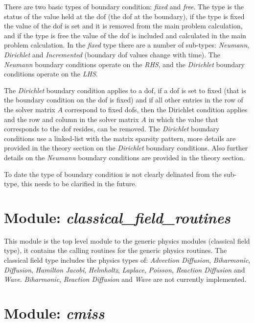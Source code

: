 There are two basic types of boundary condition: \emph{fixed} and 
\emph{free}. The type is the status of the value held at the dof (the 
dof at the boundary), if the type is fixed the value of the dof is 
set and it is removed from the main problem calculation, and if the type 
is free the value of the dof is included and calculated in the main 
problem calculation. In the \emph{fixed} type there are a number of 
sub-types: \emph{Neumann}, \emph{Dirichlet} and \emph{Incremented} 
(boundary dof values change with time). The \emph{Neumann} boundary 
conditions operate on the \emph{RHS}, and the \emph{Dirichlet} boundary 
conditions operate on the \emph{LHS}. 

The \emph{Dirichlet} boundary condition applies to a dof, if a dof is 
set to fixed (that is the boundary condition on the dof is fixed) and 
if all other entries in the row of the solver matrix $A$ correspond to 
fixed dofs, then the Dirichlet condition applies and the row and column 
in the solver matrix $A$ in which the value that corresponds to the dof 
resides, can be removed. The \emph{Dirichlet} boundary conditions use 
a linked-list with the matrix sparsity pattern, more details are provided 
in the theory section on the \emph{Dirichlet} boundary conditions. Also 
further details on the \emph{Neumann} boundary conditions are provided 
in the theory section.

To date the type of boundary condition is not clearly delinated from the 
sub-type, this needs to be clarified in the future. 


\section{Module: \emph{classical\_field\_routines}}
\label{sec:classicalfieldroutines}

This module is the top level module to the generic physics modules (classical 
field type), it contains the calling routines for the generic physics routines. 
The classical field type includes the physics types of: \emph{Advection
Diffusion}, \emph{Biharmonic}, \emph{Diffusion}, \emph{Hamilton Jacobi}, 
\emph{Helmholtz}, \emph{Laplace}, \emph{Poisson}, \emph{Reaction Diffusion} 
and \emph{Wave}. \emph{Biharmonic}, \emph{Reaction Diffusion} and \emph{Wave} 
are not currently implemented.


\section{Module: \emph{cmiss}}
\label{sec:cmiss}

